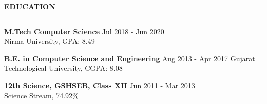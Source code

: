 \documentclass{resume} %
\renewenvironment{rSection}[1]{ %
  \sectionskip
  \textcolor{primaryColor}{\MakeUppercase{\bf #1}} %
  \sectionlineskip
  {\color{primaryColor}\hrule} %
  \begin{list}{}{ %
    \setlength{\leftmargin}{1.5em} %
  }
  \item[]
}{
  \end{list}
}
\begin{document}



\begin{rSection}{Education}

{\textbf{\textcolor{accentColor}{M.Tech Computer Science}}} \hfill {Jul 2018 - Jun 2020 }
\\ 
Nirma University, GPA: 8.49

{\textbf{\textcolor{accentColor}{B.E. in Computer Science and Engineering}}} \hfill {Aug 2013 - Apr 2017 }
Gujarat Technological University, CGPA: 8.08

{\textbf{\textcolor{accentColor}{12th Science, GSHSEB, Class XII}}}  \hfill {Jun 2011 - Mar 2013 }\\
Science Stream, 74.92\% 
 


\end{rSection}
\end{document}
